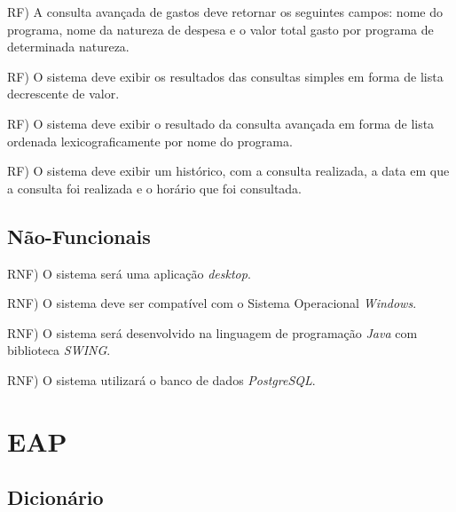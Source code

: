 \documentclass[a4paper,12pt]{article}
\begin{document}
RF) A consulta avançada de gastos deve retornar os seguintes campos: nome do programa, nome da natureza de despesa e o valor total gasto por programa de determinada natureza. \\

\addtocounter{rf}{1}


RF) O sistema deve exibir os resultados das consultas simples em forma de lista decrescente de valor.\\

\addtocounter{rf}{1}

RF) O sistema deve exibir o resultado da consulta avançada em forma de lista ordenada lexicograficamente por nome do programa.\\


\addtocounter{rf}{1}

RF) O sistema deve exibir um histórico, com a consulta realizada, a data em que a consulta foi realizada e o horário que foi consultada.


\subsection{Não-Funcionais}

\addtocounter{rnf}{1}


RNF) O sistema será uma aplicação \textit{desktop}.\\

\addtocounter{rnf}{1}

RNF) O sistema deve ser compatível com o Sistema Operacional \textit{Windows}.\\

\addtocounter{rnf}{1}

RNF) O sistema será desenvolvido na linguagem de programação \textit{Java} com biblioteca \textit{SWING}.\\

\addtocounter{rnf}{1}

RNF) O sistema utilizará o banco de dados \textit{PostgreSQL}.\\

\newpage
\section{EAP}

\subsection{Dicionário}
\end{document}
